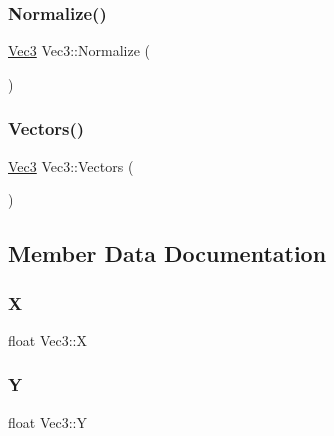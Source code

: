 \mbox{\label{classVec3_a0d4222dd154c6892c4d0f92e79a89eb8}} 
\subsubsection{\texorpdfstring{Normalize()}{Normalize()}}
{\footnotesize\ttfamily \mbox{\hyperlink{classVec3}{Vec3}} Vec3\+::\+Normalize (\begin{DoxyParamCaption}{ }\end{DoxyParamCaption})}

\mbox{\label{classVec3_a60aba12a644625b125edc09955bb335c}} 
\subsubsection{\texorpdfstring{Vectors()}{Vectors()}}
{\footnotesize\ttfamily \mbox{\hyperlink{classVec3}{Vec3}} Vec3\+::\+Vectors (\begin{DoxyParamCaption}{ }\end{DoxyParamCaption})}



\subsection{Member Data Documentation}
\mbox{\label{classVec3_a11e316f7f9654c39dc0ae0843d58882a}} 
\subsubsection{\texorpdfstring{X}{X}}
{\footnotesize\ttfamily float Vec3\+::X}

\mbox{\label{classVec3_a5cb084577e40b5fb152dc2d375ff07f2}} 
\subsubsection{\texorpdfstring{Y}{Y}}
{\footnotesize\ttfamily float Vec3\+::Y}

\mbox{\label{classVec3_ae7177886a74ecc6b6bed33afa16f6336}} 
